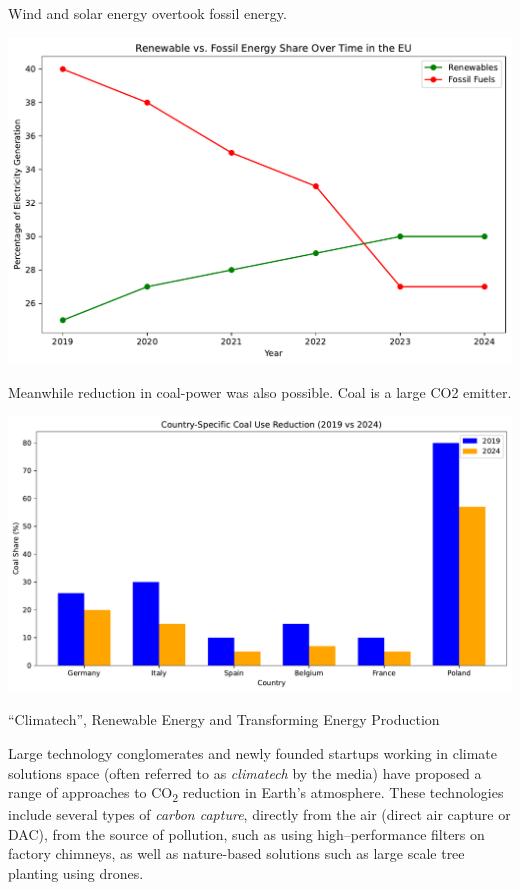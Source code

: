 \documentclass[
  letterpaper,
  DIV=11,
  numbers=noendperiod]{scrartcl}
\begin{document}
Wind and solar energy overtook fossil energy.

\includegraphics{_thesis_files/figure-pdf/cell-16-output-1.pdf}

Meanwhile reduction in coal-power was also possible. Coal is a large CO2
emitter.

\includegraphics{_thesis_files/figure-pdf/cell-17-output-1.pdf}

``Climatech'', Renewable Energy and Transforming Energy Production

Large technology conglomerates and newly founded startups working in
climate solutions space (often referred to as \emph{climatech} by the
media) have proposed a range of approaches to CO\textsubscript{2}
reduction in Earth's atmosphere. These technologies include several
types of \emph{carbon capture}, directly from the air (direct air
capture or DAC), from the source of pollution, such as using
high--performance filters on factory chimneys, as well as nature-based
solutions such as large scale tree planting using drones.
\end{document}
